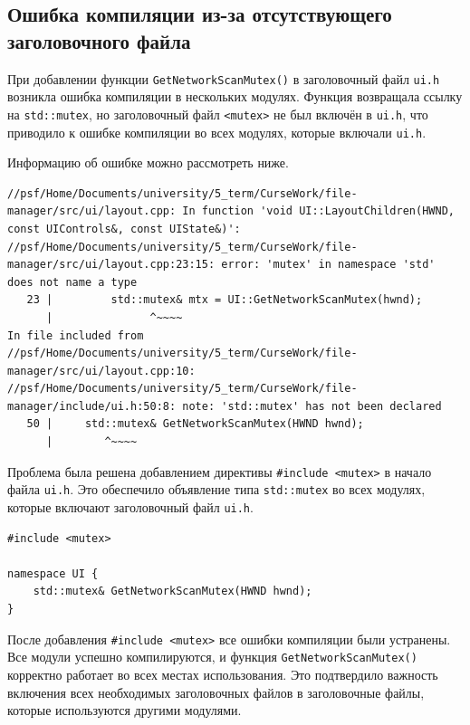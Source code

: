 \subsection{Ошибка компиляции из-за отсутствующего заголовочного файла}

При добавлении функции \texttt{GetNetworkScanMutex()} в заголовочный файл \texttt{ui.h}
возникла ошибка компиляции в нескольких модулях. Функция возвращала
ссылку на \texttt{std::mutex}, но заголовочный файл \texttt{<mutex>} не был включён в
\texttt{ui.h}, что приводило к ошибке компиляции во всех модулях, которые включали
\texttt{ui.h}.

Информацию об ошибке можно рассмотреть ниже.

\begin{lstlisting}[style=CodeListing]
//psf/Home/Documents/university/5_term/CurseWork/file-manager/src/ui/layout.cpp: In function 'void UI::LayoutChildren(HWND, const UIControls&, const UIState&)':
//psf/Home/Documents/university/5_term/CurseWork/file-manager/src/ui/layout.cpp:23:15: error: 'mutex' in namespace 'std' does not name a type
   23 |         std::mutex& mtx = UI::GetNetworkScanMutex(hwnd);
      |               ^~~~~
In file included from //psf/Home/Documents/university/5_term/CurseWork/file-manager/src/ui/layout.cpp:10:
//psf/Home/Documents/university/5_term/CurseWork/file-manager/include/ui.h:50:8: note: 'std::mutex' has not been declared
   50 |     std::mutex& GetNetworkScanMutex(HWND hwnd);
      |        ^~~~~
\end{lstlisting}

Проблема была решена добавлением директивы \texttt{\#include <mutex>} в начало файла \texttt{ui.h}.
Это обеспечило объявление типа \texttt{std::mutex} во всех модулях, которые включают
заголовочный файл \texttt{ui.h}.

\begin{lstlisting}[style=CodeListing]
#include <mutex>

namespace UI {
    std::mutex& GetNetworkScanMutex(HWND hwnd);
}
\end{lstlisting}

После добавления \texttt{\#include <mutex>} все ошибки компиляции были устранены. Все модули
успешно компилируются, и функция \texttt{GetNetworkScanMutex()} корректно работает во всех местах
использования. Это подтвердило важность включения всех необходимых заголовочных файлов в
заголовочные файлы, которые используются другими модулями.
